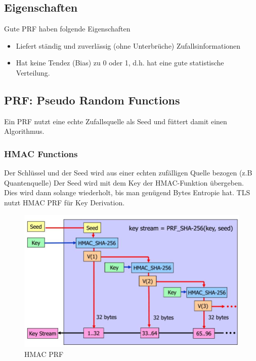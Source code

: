 \subsection{Eigenschaften}
Gute PRF haben folgende Eigenschaften
\begin{itemize}
	\item Liefert ständig und zuverlässig (ohne Unterbrüche) Zufallsinformationen
	\item Hat keine Tendez (Bias) zu 0 oder 1, d.h. hat eine gute statistische Verteilung.
\end{itemize}

\subsection{PRF: Pseudo Random Functions}
Ein PRF nutzt eine echte Zufallsquelle als Seed und füttert damit einen Algorithmus. 

\subsubsection{HMAC Functions}
Der Schlüssel und der Seed wird aus einer echten zufälligen Quelle bezogen (z.B Quantenquelle) Der Seed wird mit dem Key der HMAC-Funktion übergeben. Dies wird dann solange wiederholt, bis man genügend Bytes Entropie hat. TLS nutzt HMAC PRF für Key Derivation.

\begin{figure}[h]
\centering
\includegraphics[width=0.7\linewidth]{images/hmac_prf}
\caption{HMAC PRF}
\label{fig:hmacprf}
\end{figure}


